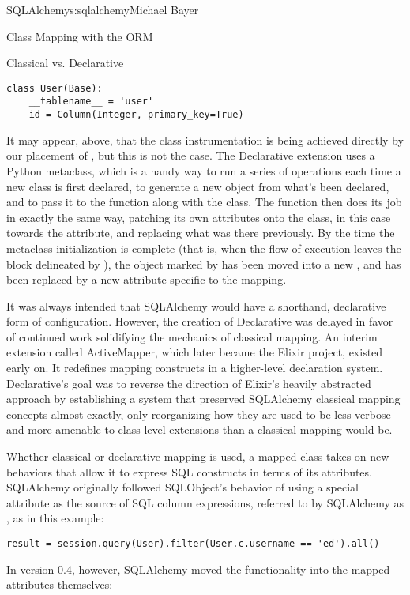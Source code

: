 \begin{aosachapter}{SQLAlchemy}{s:sqlalchemy}{Michael Bayer}
\begin{aosasect1}{Class Mapping with the ORM}
\begin{aosasect2}{Classical vs. Declarative}
\begin{verbatim}
class User(Base):
    __tablename__ = 'user'
    id = Column(Integer, primary_key=True)
\end{verbatim}

It may appear, above, that the class instrumentation is being achieved directly
by our placement of , but this is not the case.   The Declarative
extension uses a Python metaclass, which is a handy way to run a series
of operations each time a new class is first declared, to generate a new 
object from what's been declared, and to pass it to the  function along with
the class.  The  function then does its job in exactly the same way,
patching its own attributes onto the class, in this case towards the  attribute,
and replacing what was there previously.  By the time the metaclass initialization is complete
(that is, when the flow of execution leaves the block delineated by ), the
 object marked by  has been moved into a new , and 
has been replaced by a new attribute specific to the mapping.

It was always intended that SQLAlchemy would have a
shorthand, declarative form of configuration. However, the creation of Declarative
was delayed in favor of continued work solidifying the mechanics of classical mapping.
An interim extension called ActiveMapper, which
later became the Elixir project, existed early on. It redefines mapping constructs in a higher-level
declaration system.   Declarative's goal was to reverse the direction of Elixir's heavily abstracted
approach by establishing a system that preserved SQLAlchemy classical mapping concepts almost
exactly, only reorganizing how they are used to be less verbose and more amenable to
class-level extensions than a classical mapping would be.

Whether classical or declarative mapping is used, a mapped class takes on new
behaviors that allow it to express SQL constructs in terms of its attributes.
SQLAlchemy originally followed SQLObject's behavior of using a special
attribute as the source of SQL column expressions, referred to by SQLAlchemy
as , as in this example:

\begin{verbatim}
result = session.query(User).filter(User.c.username == 'ed').all()
\end{verbatim}

In version 0.4, however, SQLAlchemy moved the functionality into the mapped
attributes themselves:


\end{aosasect2}
\end{aosasect1}
\end{aosachapter}
